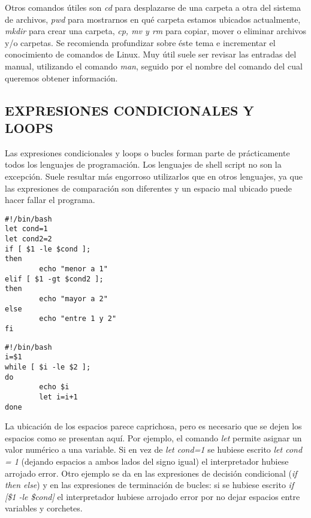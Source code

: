 Otros comandos útiles son \textit{cd} para desplazarse de una carpeta a otra del sistema de archivos, \textit{pwd} para mostrarnos
en qué carpeta estamos ubicados actualmente, \textit{mkdir} para crear una carpeta, \textit{cp, mv y rm} para copiar, mover o eliminar
archivos y/o carpetas. Se recomienda profundizar sobre éste tema e incrementar el conocimiento de comandos de Linux. Muy útil suele ser revisar las entradas del manual, utilizando el comando \textit{man}, seguido por el nombre del comando del cual queremos obtener información.

\subsection{EXPRESIONES CONDICIONALES Y LOOPS}

Las expresiones condicionales y loops o bucles forman parte de prácticamente todos los lenguajes de programación. Los lenguajes de shell script no son la excepción. Suele resultar más engorroso utilizarlos que en otros lenguajes, ya que las expresiones de comparación son diferentes y un espacio mal ubicado puede hacer fallar el programa.
\begin{lstlisting}
#!/bin/bash
let cond=1
let cond2=2
if [ $1 -le $cond ];
then
        echo "menor a 1"
elif [ $1 -gt $cond2 ];
then
        echo "mayor a 2"
else
        echo "entre 1 y 2"
fi
\end{lstlisting}
\begin{lstlisting}
#!/bin/bash
i=$1
while [ $i -le $2 ];
do
        echo $i
        let i=i+1
done
\end{lstlisting}

La ubicación de los espacios parece caprichosa, pero es necesario que se dejen los espacios como se presentan aquí. Por ejemplo, el comando
\textit{let} permite asignar un valor numérico a una variable. Si en vez de \textit{let cond=1} se hubiese escrito \textit{let cond = 1} (dejando espacios a ambos lados del signo igual) el interpretador hubiese arrojado error. Otro ejemplo se da en las expresiones de decisión condicional (\textit{if then else}) y  en las expresiones de terminación de bucles: si se hubiese escrito \textit{if [\$1 -le \$cond]} el interpretador hubiese arrojado error por no dejar espacios entre variables y corchetes.


